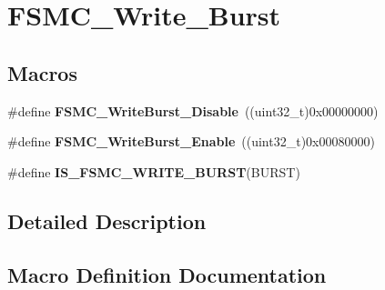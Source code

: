 \hypertarget{group___f_s_m_c___write___burst}{}\section{F\+S\+M\+C\+\_\+\+Write\+\_\+\+Burst}
\label{group___f_s_m_c___write___burst}
\subsection*{Macros}
\begin{DoxyCompactItemize}
\item 
\hypertarget{group___f_s_m_c___write___burst_ga65a49ecd05b3a128e8908c6a625adae7}{}\#define {\bfseries F\+S\+M\+C\+\_\+\+Write\+Burst\+\_\+\+Disable}~((uint32\+\_\+t)0x00000000)\label{group___f_s_m_c___write___burst_ga65a49ecd05b3a128e8908c6a625adae7}

\item 
\hypertarget{group___f_s_m_c___write___burst_ga1b2b66a0eb42778c2cc9a05003cf7655}{}\#define {\bfseries F\+S\+M\+C\+\_\+\+Write\+Burst\+\_\+\+Enable}~((uint32\+\_\+t)0x00080000)\label{group___f_s_m_c___write___burst_ga1b2b66a0eb42778c2cc9a05003cf7655}

\item 
\#define {\bfseries I\+S\+\_\+\+F\+S\+M\+C\+\_\+\+W\+R\+I\+T\+E\+\_\+\+B\+U\+R\+S\+T}(B\+U\+R\+S\+T)
\end{DoxyCompactItemize}


\subsection{Detailed Description}


\subsection{Macro Definition Documentation}
\hypertarget{group___f_s_m_c___write___burst_gab7b03a33fab765827832abbf07d01a10}{}

